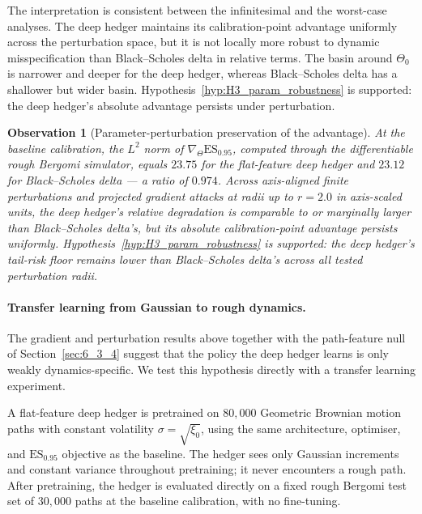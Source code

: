 \documentclass[12pt,a4paper]{article}
\theoremstyle{definition}
\theoremstyle{plain}
\theoremstyle{remark}
\theoremstyle{plain}
\newtheorem{observation}{Observation}[section]
\begin{document}
The interpretation is consistent between the infinitesimal and
the worst-case analyses. The deep hedger maintains its
calibration-point advantage uniformly across the perturbation
space, but it is not locally more robust to dynamic
misspecification than Black--Scholes delta in relative terms.
The basin around $\Theta_0$ is narrower and deeper for the deep
hedger, whereas Black--Scholes delta has a shallower but wider
basin. Hypothesis~\ref{hyp:H3_param_robustness} is supported:
the deep hedger's absolute advantage persists under perturbation.

\begin{observation}[Parameter-perturbation preservation of the advantage]\label{obs:parameter_perturbation}\label{prop:h3_refuted}
At the baseline calibration, the $L^2$ norm of
$\nabla_\Theta \mathrm{ES}_{0.95}$, computed through the
differentiable rough Bergomi simulator, equals $23.75$ for the
flat-feature deep hedger and $23.12$ for Black--Scholes delta
--- a ratio of $0.974$. Across axis-aligned finite perturbations
and projected gradient attacks at radii up to $r = 2.0$ in
axis-scaled units, the deep hedger's relative degradation is
comparable to or marginally larger than Black--Scholes delta's,
but its absolute calibration-point advantage persists uniformly.
\emph{Hypothesis~\ref{hyp:H3_param_robustness} is supported}: the deep hedger's tail-risk floor remains lower than Black--Scholes delta's across all tested perturbation radii.
\end{observation}

\paragraph{Transfer learning from Gaussian to rough dynamics.}
The gradient and perturbation results above together with the
path-feature null of Section~\ref{sec:6_3_4} suggest that the
policy the deep hedger learns is only weakly dynamics-specific.
We test this hypothesis directly with a transfer learning
experiment.

A flat-feature deep hedger is pretrained on $80{,}000$ Geometric
Brownian motion paths with constant volatility
$\sigma = \sqrt{\xi_0}$, using the same architecture, optimiser,
and $\mathrm{ES}_{0.95}$ objective as the baseline. The hedger
sees only Gaussian increments and constant variance throughout
pretraining; it never encounters a rough path. After
pretraining, the hedger is evaluated directly on a fixed rough
Bergomi test set of $30{,}000$ paths at the baseline calibration,
with no fine-tuning.
\end{document}
